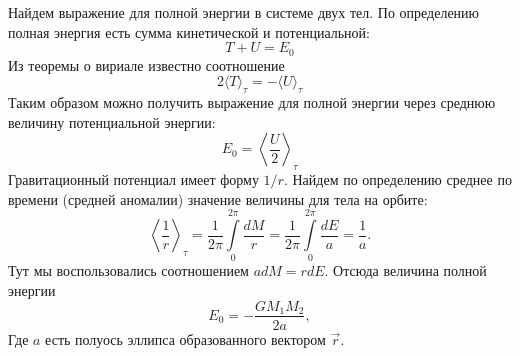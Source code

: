 Найдем выражение для полной энергии в системе двух тел. По определению полная энергия есть сумма кинетической и потенциальной:
\begin{equation*}
	T + U = E_0
\end{equation*}
Из теоремы о вириале известно соотношение
\begin{equation*}
	2\langle T \rangle_\tau = -\langle U \rangle_\tau
\end{equation*}
Таким образом можно получить выражение для полной энергии через среднюю величину потенциальной энергии:
\begin{equation*}
	E_0 = \left\langle \frac{U}{2} \right\rangle_\tau
\end{equation*}
Гравитационный потенциал имеет форму $1/r$. Найдем по определению среднее по времени (средней аномалии) значение величины для тела на орбите:
\begin{equation*}
	\left\langle \frac{1}{r} \right\rangle_\tau = \frac{1}{2 \pi} \int\limits_0^{2\pi}\frac{dM}{r} = \frac{1}{2 \pi} \int\limits_0^{2\pi}\frac{dE}{a} = \frac{1}{a}.
\end{equation*}
Тут мы воспользовались соотношением $a dM = r dE$. Отсюда величина полной энергии
\begin{equation*}
	E_0 = -\frac{G M_1 M_2}{2a},
\end{equation*}
Где $a$ есть полуось эллипса образованного вектором $\vec{r}$.





